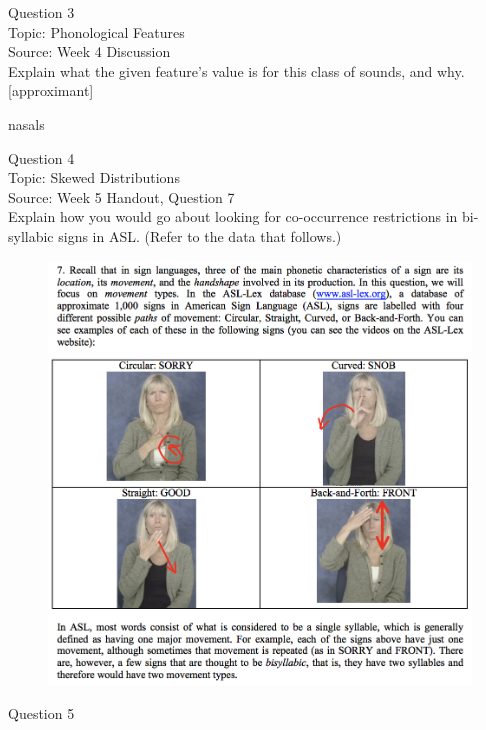 \documentclass[12pt]{article}
\begin{document}
{\large Question 3}\\

Topic: Phonological Features\\
Source: Week 4 Discussion\\

Explain what the given feature’s value is for this class of sounds, and why.\\

{[approximant]}

nasals


\newpage

{\large Question 4}\\

Topic: Skewed Distributions\\
Source: Week 5 Handout, Question 7\\

Explain how you would go about looking for co-occurrence restrictions in bi-syllabic signs in ASL. (Refer to the data that follows.)\\

\begin{figure}[H]
\includegraphics{../images/ASL_movement.png}
\end{figure}

\newpage

{\large Question 5}\\
\end{document}
